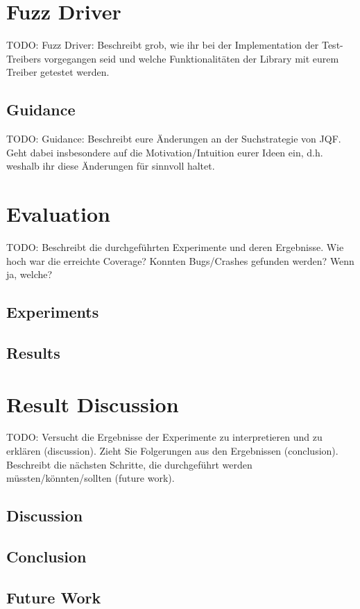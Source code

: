 \documentclass[runningheads]{llncs}
\begin{document}
\section{Fuzz Driver}
TODO: Fuzz Driver: Beschreibt grob, wie ihr bei der Implementation der Test-Treibers vorgegangen seid und welche Funktionalitäten der Library mit eurem Treiber getestet werden.
\subsection{Guidance}
TODO: Guidance: Beschreibt eure Änderungen an der Suchstrategie von JQF. Geht dabei insbesondere auf die Motivation/Intuition eurer Ideen ein, d.h. weshalb ihr diese Änderungen für sinnvoll haltet.


\section{Evaluation}
TODO: Beschreibt die durchgeführten Experimente und deren Ergebnisse. Wie hoch war die erreichte Coverage? Konnten Bugs/Crashes gefunden werden? Wenn ja, welche?
\subsection{Experiments}
\subsection{Results}

\section{Result Discussion}
TODO: Versucht die Ergebnisse der Experimente zu interpretieren und zu erklären (discussion). Zieht Sie Folgerungen aus den Ergebnissen (conclusion). Beschreibt die nächsten Schritte, die durchgeführt werden müssten/könnten/sollten (future work).
\subsection{Discussion}
\subsection{Conclusion}
\subsection{Future Work}
\end{document}
